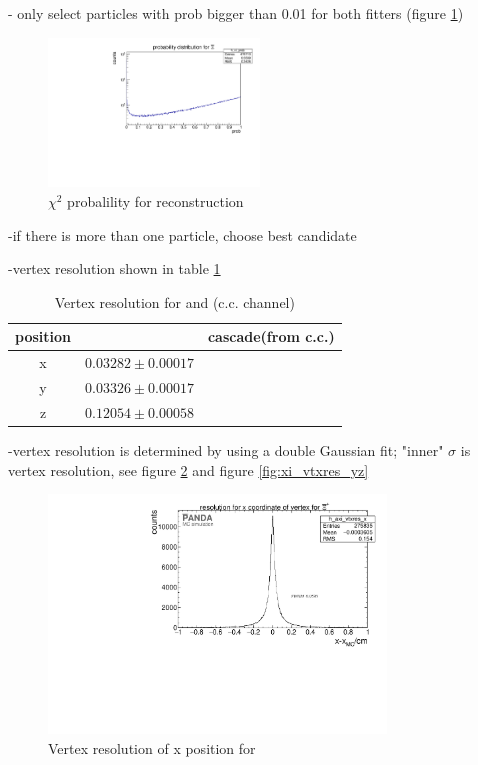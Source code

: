 		- only select particles with prob bigger than 0.01 for both fitters (figure \ref{fig:XiPlus_prob})
		
		\begin{figure}
			\centering
				\includegraphics[width=0.50\textwidth]{./plots/Xi/XiPlus_prob.pdf}
			\caption{$\chi^{2}$ probalility for \anticascade reconstruction}
			\label{fig:XiPlus_prob}
		\end{figure}
		
		
		-if there is more than one particle, choose best candidate
		
		-vertex resolution shown in table \ref{tab:XiPlus_vtxres}
		
		\begin{table}
			\centering
			\caption{Vertex resolution for \anticascade and \cascade (c.c. channel)}
			\label{tab:XiPlus_vtxres}
			\begin{tabular}{ccc}
				\hline
				position & \anticascade & cascade(from c.c.) \\\hline
				\hline
				x & $0.03282 \pm 0.00017$ & \\
				y & $0.03326 \pm 0.00017$ & \\
				z & $0.12054 \pm 0.00058$ & \\
				\hline
				    
			\end{tabular}
		\end{table}
		
		-vertex resolution is determined by using a double Gaussian fit; "inner" $\sigma$ is vertex resolution, see figure \ref{fig:xi_vtxres_x} 
		and figure \ref{fig:xi_vtxres_yz}
		
		\begin{figure}
			\centering
			\includegraphics[width=0.8\textwidth]{./plots/Xi/XiPlus_vtxres_x.pdf}
			\caption{Vertex resolution of x position for \anticascade}
			\label{fig:xi_vtxres_x}
			
		\end{figure}
		
